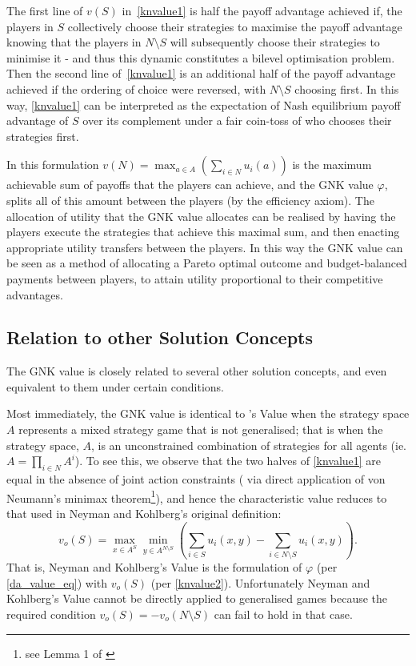 The first line of $v(S)$ in~\eqref{knvalue1} is half the payoff advantage achieved if, the players in $S$ collectively choose their strategies to maximise the payoff advantage knowing that the players in $N\setminus S$ will subsequently choose their strategies to minimise it - and thus this dynamic constitutes a bilevel optimisation problem.
Then the second line of~\eqref{knvalue1} is an additional half of the payoff advantage achieved if the ordering of choice were reversed, with $N\setminus S$ choosing first.
In this way, \eqref{knvalue1} can be interpreted as the expectation of Nash equilibrium payoff advantage of $S$ over its complement under a fair coin-toss of who chooses their strategies first.

In this formulation $v(N) = \max_{a\in A} (\sum_{i\in N} u_i(a))$ is the maximum achievable sum of payoffs that the players can achieve, and the GNK value $\varphi$, splits all of this amount between the players (by the efficiency axiom).
The allocation of utility that the GNK value allocates can be realised by having the players execute the strategies that achieve this maximal sum, and then enacting appropriate utility transfers between the players.
In this way the GNK value can be seen as a method of allocating a Pareto optimal outcome and budget-balanced payments between players, to attain utility proportional to their competitive advantages.

\subsection{Relation to other Solution Concepts}\label{relating_to_the_old}

The GNK value is closely related to several other solution concepts, and even equivalent to them under certain conditions.

Most immediately, the GNK value is identical to \cite{value2}'s Value when the strategy space $A$ represents a mixed strategy game that is not generalised; that is when the strategy space, $A$, is an unconstrained combination of strategies for all agents (ie. $A = \prod_{i\in N}A^i$).
To see this, we observe that the two halves of \eqref{knvalue1} are equal in the absence of joint action constraints (%
via direct application of von Neumann's minimax theorem\footnote{see Lemma 1 of \cite{value2}}), 
and hence the characteristic value reduces to that used in Neyman and Kohlberg's original definition:
\begin{equation}\label{knvalue2}v_o(S) = \max_{x\in A^S}\min_{y\in A^{N\setminus S}} \left(\sum_{i\in S} u_i(x,y) - \sum_{i\in N\setminus S} u_i(x,y) \right).\end{equation}
%
That is, Neyman and Kohlberg's Value is the formulation of $\varphi$ (per \eqref{da_value_eq}) 
with $v_o(S)$ (per \eqref{knvalue2}).
Unfortunately Neyman and Kohlberg's Value cannot be directly applied to generalised games because the required condition $v_o(S)=-v_o(N\setminus S)$ can fail to hold in that case. 

